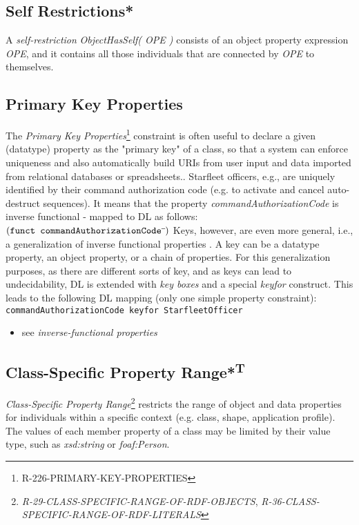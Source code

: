 \documentclass{llncs}
\newcommand{\ms}[1]{\texttt{#1}}
\begin{document}
\subsection{Self Restrictions*}

A \emph{self-restriction} \emph{ObjectHasSelf( OPE )} consists of an object property expression \emph{OPE}, and it contains all those individuals that are connected by \emph{OPE} to themselves. 

\subsection{Primary Key Properties}

The \emph{Primary Key Properties}\footnote{R-226-PRIMARY-KEY-PROPERTIES} constraint is often useful to declare a given (datatype) property as the "primary key" of a class, so that a system can enforce uniqueness and also automatically build URIs from user input and data imported from relational databases or spreadsheets.. 
Starfleet officers, e.g., are uniquely identified by their command authorization code (e.g. to activate and cancel auto-destruct sequences).
It means that the property \emph{commandAuthorizationCode} is inverse functional - mapped to DL as follows:
$(\ms{funct commandAuthorizationCode}\sp{\overline{\ }})$
Keys, however, are even more general, i.e., a generalization of inverse functional properties \cite{Schneider2009}.
A key can be a datatype property, an object property, or a chain of properties.
For this generalization purposes, as there are different sorts of key, and as keys can lead to undecidability, 
DL is extended with \emph{key boxes} and a special \emph{keyfor} construct\cite{Lutz2005}.
This leads to the following DL mapping (only one simple property constraint):
\ms{commandAuthorizationCode \ms{keyfor} StarfleetOfficer}

\begin{itemize}
	\item see \emph{inverse-functional properties}
\end{itemize}

\subsection{Class-Specific Property Range*\textsuperscript{T}}		

{\em Class-Specific Property Range}\footnote{{\em R-29-CLASS-SPECIFIC-RANGE-OF-RDF-OBJECTS}, {\em R-36-CLASS-SPECIFIC-RANGE-OF-RDF-LITERALS}} restricts the range of object and data properties for individuals within a specific context (e.g. class, shape, application profile).
The values of each member property of a class may be limited by their value type, such as \emph{xsd:string} or \emph{foaf:Person}. 
\end{document}
